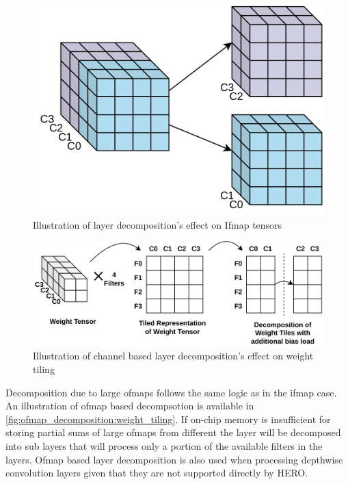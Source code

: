\begin{figure}[ht]
    \centering
    \includegraphics[scale=0.25]{fig/ifmap_decomposition.pdf}
    \caption{Illustration of layer decomposition's effect on Ifmap tensors}
    \label{fig:ifmap_decomposition}
\end{figure}


\begin{figure}[ht]
    \centering
    \includegraphics[scale=0.4]{fig/ifmap_decomposition_tiling_repr.pdf}
    \caption{Illustration of channel based layer decomposition's effect on weight tiling}
    \label{fig:ifmap_decomposition:weight_tiling}
\end{figure}

Decomposition due to large ofmaps follows the same logic as in the ifmap case.
An illustration of ofmap based decompsotion is available in
\autoref{fig:ofmap_decomposition:weight_tiling}. If on-chip memory is
insufficient for storing partial sums of large ofmaps from different the layer will be
decomposed into sub layers that will process only a portion of the available
filters in the layers. Ofmap based layer decomposition is also used when
processing depthwise convolution layers given that they are not supported
directly by HERO.  


